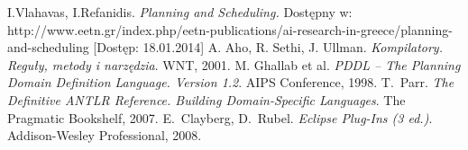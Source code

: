 \begin{thebibliography}{1}
 I.Vlahavas, I.Refanidis. \emph{Planning and Scheduling.} Dostępny w: http://www.eetn.gr/index.php/eetn-publications/ai-research-in-greece/planning-and-scheduling [Dostęp: 18.01.2014]
A. Aho, R. Sethi, J. Ullman. \emph{Kompilatory. Reguły, metody i narzędzia}.
WNT, 2001.
M. Ghallab et al. \emph{PDDL -- The Planning Domain Definition Language. Version 1.2}.
AIPS Conference, 1998.
T.~Parr. \emph{The Definitive ANTLR Reference. Building Domain-Specific Languages}. 
The Pragmatic Bookshelf, 2007.
E.~Clayberg, D.~Rubel. \emph{Eclipse Plug-Ins (3 ed.)}. Addison-Wesley Professional, 2008. 

\end{thebibliography}
